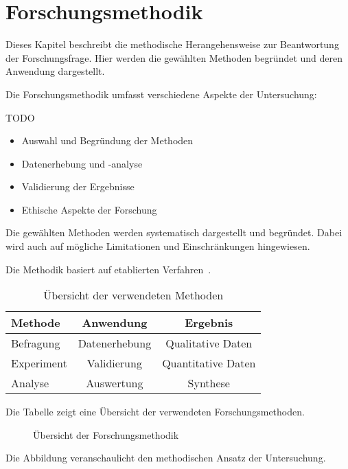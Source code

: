 
\chapter{Forschungsmethodik}\label{cha:methodology}

Dieses Kapitel beschreibt die methodische Herangehensweise zur Beantwortung der Forschungsfrage. 
Hier werden die gewählten Methoden begründet und deren Anwendung dargestellt.

Die Forschungsmethodik umfasst verschiedene Aspekte der Untersuchung:

TODO

\begin{itemize}[leftmargin=0.63cm, label=\textbullet]
    \item Auswahl und Begründung der Methoden
    \item Datenerhebung und -analyse
    \item Validierung der Ergebnisse
    \item Ethische Aspekte der Forschung
\end{itemize}

Die gewählten Methoden werden systematisch dargestellt und begründet. Dabei wird auch auf mögliche Limitationen und Einschränkungen hingewiesen.

Die Methodik basiert auf etablierten Verfahren~\cite{mustermann2023}.

\begin{table}[htbp]
\centering
\caption{Übersicht der verwendeten Methoden}
\label{tab:methoden}
\begin{tabular}{lcc}
\toprule
Methode & Anwendung & Ergebnis \\
\midrule
Befragung & Datenerhebung & Qualitative Daten \\
Experiment & Validierung & Quantitative Daten \\
Analyse & Auswertung & Synthese \\
\bottomrule
\end{tabular}
\end{table}

Die Tabelle zeigt eine Übersicht der verwendeten Forschungsmethoden.

\begin{figure}[htbp]
\centering
\caption{Übersicht der Forschungsmethodik}
\label{fig:methodik}
\end{figure}

Die Abbildung veranschaulicht den methodischen Ansatz der Untersuchung.


